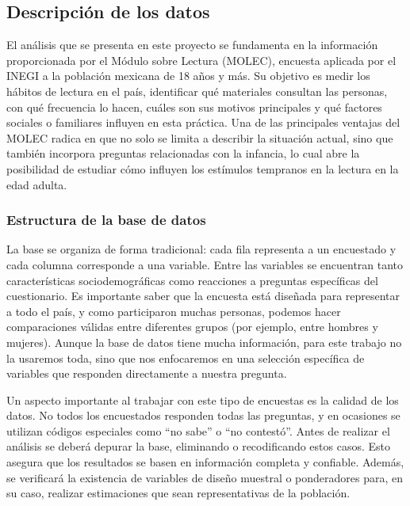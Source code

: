 \documentclass[aps,reprint]{revtex4-2}
\begin{document}
\subsection{Descripción de los datos}



El análisis que se presenta en este proyecto se fundamenta en la información proporcionada por el Módulo sobre Lectura (MOLEC), encuesta aplicada por el INEGI a la población mexicana de 18 años y más. Su objetivo es medir los hábitos de lectura en el país, identificar qué materiales consultan las personas, con qué frecuencia lo hacen, cuáles son sus motivos principales y qué factores sociales o familiares influyen en esta práctica. Una de las principales ventajas del MOLEC radica en que no solo se limita a describir la situación actual, sino que también incorpora preguntas relacionadas con la infancia, lo cual abre la posibilidad de estudiar cómo influyen los estímulos tempranos en la lectura en la edad adulta.

\subsubsection{Estructura de la base de datos}
La base se organiza de forma tradicional: cada fila representa a un encuestado y cada columna corresponde a una variable. Entre las variables se encuentran tanto características sociodemográficas como reacciones a preguntas específicas del cuestionario. Es importante saber que la encuesta está diseñada para representar a todo el país, y como participaron muchas personas, podemos hacer comparaciones válidas entre diferentes grupos (por ejemplo, entre hombres y mujeres). Aunque la base de datos tiene mucha información, para este trabajo no la usaremos toda, sino que nos enfocaremos en una selección específica de variables que responden directamente a nuestra pregunta.

Un aspecto importante al trabajar con este tipo de encuestas es la calidad de los datos. No todos los encuestados responden todas las preguntas, y en ocasiones se utilizan códigos especiales como “no sabe” o “no contestó”. Antes de realizar el análisis se deberá depurar la base, eliminando o recodificando estos casos. Esto asegura que los resultados se basen en información completa y confiable. Además, se verificará la existencia de variables de diseño muestral o ponderadores para, en su caso, realizar estimaciones que sean representativas de la población.
\end{document}
